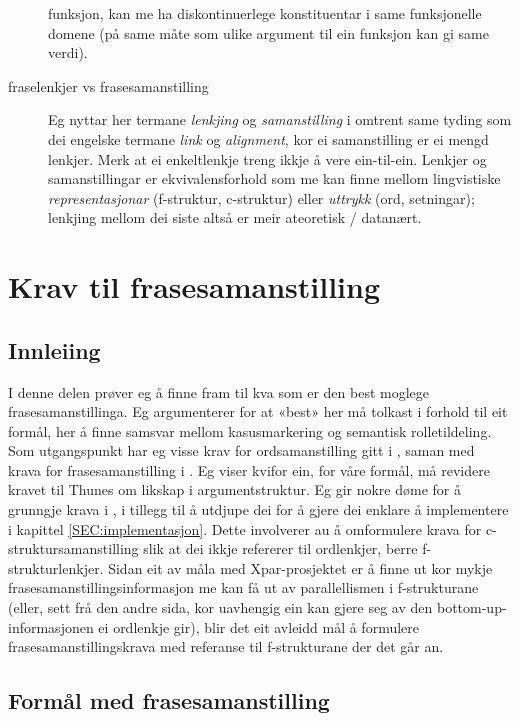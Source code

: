 \documentclass[11pt,a4paper,oneside,draft]{book}
\begin{document}
\begin{description}
  funksjon, kan me ha diskontinuerlege konstituentar i same
  funksjonelle domene (på same måte som ulike argument til ein
  funksjon kan gi same verdi).
\item [fraselenkjer vs frasesamanstilling] Eg nyttar her termane
  \emph{lenkjing} og \emph{samanstilling} i omtrent same tyding som dei engelske
  termane \emph{link} og \emph{alignment}, kor ei samanstilling er ei mengd
  lenkjer. Merk at ei enkeltlenkje treng ikkje å vere ein-til-ein.
  Lenkjer og samanstillingar er ekvivalensforhold som me kan finne
  mellom lingvistiske \emph{representasjonar} (f-struktur, c-struktur)
  eller \emph{uttrykk} (ord, setningar); lenkjing mellom dei siste altså er
  meir ateoretisk / datanært.
\end{description}
\chapter{Krav til frasesamanstilling}
\label{sec-3}

\label{SEC:ideell}

\section{Innleiing}
\label{sec-3.1}

I denne delen prøver eg å finne fram til kva som er den best moglege
frasesamanstillinga. Eg argumenterer for at «best» her må tolkast i
forhold til eit formål, her å finne samsvar mellom kasusmarkering og
semantisk rolletildeling. Som utgangspunkt har eg visse krav for
ordsamanstilling gitt i \citet{thunes2003eal}, saman med krava for
frasesamanstilling i \citet{dyvik2009lmp}. Eg viser kvifor ein, for
våre formål, må revidere kravet til Thunes om likskap i
argumentstruktur. Eg gir nokre døme for å grunngje krava i
\citet{dyvik2009lmp}, i tillegg til å utdjupe dei for å gjere dei
enklare å implementere i kapittel \ref{SEC:implementasjon}. Dette
involverer au å omformulere krava for c-struktursamanstilling slik at
dei ikkje refererer til ordlenkjer, berre f-strukturlenkjer. Sidan eit
av måla med Xpar-prosjektet er å finne ut kor mykje
frasesamanstillingsinformasjon me kan få ut av parallellismen i
f-strukturane (eller, sett frå den andre sida, kor uavhengig ein kan
gjere seg av den bottom-up-informasjonen ei ordlenkje gir), blir det
eit avleidd mål å formulere frasesamanstillingskrava med referanse til
f-strukturane der det går an.

\section{Formål med frasesamanstilling}
\label{sec-3.2}
\end{document}
